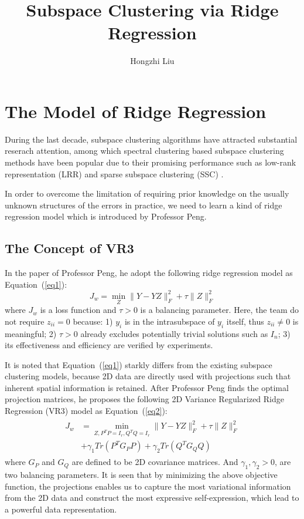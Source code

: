 \documentclass[twocolumn]{article}
\author{Hongzhi Liu}
\title{Subspace Clustering via Ridge Regression}
\begin{document}
	\maketitle
	\par
	\section{The Model of Ridge Regression}
	During the last decade, subspace clustering algorithms have attracted substantial reserach attention, among which spectral clustering based subspace clustering methods have been popular due to their promising performance such as low-rank representation (LRR) \cite{Liu2010Robust} and sparse subspace clustering (SSC) \cite{Elhamifar2013Sparse}. 
	
	In order to overcome the limitation of requiring prior knowledge on the usually unknown structures of the errors in practice, we need to learn a kind of ridge regression model \cite{Peng2017Subspace} which is introduced by Professor Peng.
	\subsection{The Concept of VR3}
	 In the paper of Professor Peng, he adopt the following ridge regression model as Equation~(\ref{eq1}):
	\begin{equation}
	J_w= \min_Z \parallel Y-YZ\parallel_F^2+ \tau\parallel Z\parallel_F^2 \label{eq1}
	\end{equation}
	where $J_w$ is a loss function and $\tau > 0$ is a balancing parameter. Here, the team do not require $z_{ii} = 0$ because: 1) $y_i$ is in the intrasubspace of $y_i$ itself, thus $z_{ii} \neq 0$ is meaningful; 2) $\tau > 0$ already excludes potentially trivial solutions such as $I_n$; 3) its effectiveness and efficiency are verified by experiments.
	
	It is noted that Equation~(\ref{eq1}) starkly differs from the existing subspace clustering models, because 2D data are directly used with projections such that inherent spatial information is retained. After Professor Peng finds the optimal projection matrices, he proposes the following 2D Variance Regularized Ridge Regression (VR3) model as Equation~(\ref{eq2}): 
	\begin{equation}
	\begin{aligned}
	\begin{split}
	J_w&= \min_{Z,P^TP=I_r,Q^TQ=I_r} \parallel Y-YZ \parallel_F^2+ \tau \parallel Z \parallel_F^2 \\
	&+\gamma_1 Tr\left(P^TG_PP\right)+\gamma_2 Tr\left(Q^TG_QQ\right)    \label{eq2}
	\end{split} 
	\end{aligned}
	\end{equation}
	where $G_P$ and $G_Q$ are defined to be 2D covariance matrices. And $\gamma_1, \gamma_2 > 0$, are two balancing parameters. It is seen that by minimizing the above objective function, the projections enables us to capture the most variational information from the 2D data and construct the most expressive self-expression, which lead to a powerful data representation.
\end{document}
